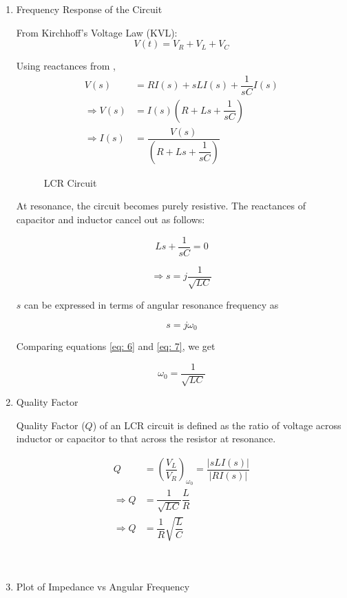 \documentclass[journal,12pt,twocolumn]{IEEEtran}
\theoremstyle{remark}
\begin{document}
\begin{enumerate}
\item {Frequency Response of the Circuit}

From Kirchhoff's Voltage Law (KVL):
\begin{equation}
V(t) = V_R + V_L + V_C \label{eq:KVL}
\end{equation}

Using reactances from ,
\begin{align}
    V(s) &= R I(s) + sL I(s) + \dfrac{1}{sC} I(s)\\
    \Rightarrow V(s) &= I(s)\left(R + Ls + \dfrac{1}{sC}\right)\\
    \Rightarrow I(s) &= \dfrac{V(s)}{\left(R + Ls + \dfrac{1}{sC}\right)} \label{eq: 4}
\end{align}

\begin{figure}[h]
 \centering
    
    \caption{LCR Circuit}
    \label{fig:2}
\end{figure}

At resonance, the circuit becomes purely resistive. The reactances of capacitor and inductor cancel out as follows:

\begin{equation}
    Ls + \dfrac{1}{sC} = 0
\end{equation}

\begin{equation}
    \Rightarrow s = j\dfrac{1}{\sqrt{LC}} \label{eq: 6}
\end{equation}

$s$ can be expressed in terms of angular resonance frequency as

\begin{equation}
    s = j\omega_0 \label{eq: 7}
\end{equation}

Comparing equations \eqref{eq: 6} and \eqref{eq: 7}, we get

\begin{equation}
    \omega_0 = \dfrac{1}{\sqrt{LC}}
\end{equation}

\item{Quality Factor}

Quality Factor ($Q$) of an LCR circuit is defined as the ratio of voltage across inductor or capacitor to that across the resistor at resonance.

\begin{align}
    Q &= \left(\dfrac{V_L}{V_R}\right)_{\omega_0} = \dfrac{\lvert{sLI(s)}\rvert}{\lvert RI(s) \rvert}\\
    \Rightarrow Q &= \dfrac{1}{\sqrt{LC}}\dfrac{L}{R}\\
    \Rightarrow Q &= \dfrac{1}{R}\sqrt{\dfrac{L}{C}}
\end{align}\\
\\
\item{Plot of Impedance vs Angular Frequency}


\end{enumerate}
\end{document}
